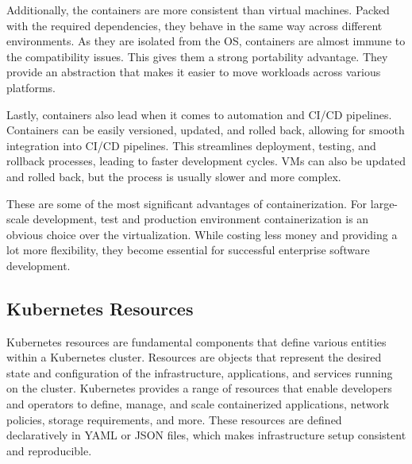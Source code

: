 Additionally, the containers are more consistent than virtual machines. Packed with the required dependencies, they behave in the same way across different environments. As they are isolated from the OS, containers are almost immune to the compatibility issues. This gives them a strong portability advantage. They provide an abstraction that makes it easier to move workloads across various platforms.

Lastly, containers also lead when it comes to automation and CI/CD pipelines. Containers can be easily versioned, updated, and rolled back, allowing for smooth integration into CI/CD pipelines. This streamlines deployment, testing, and rollback processes, leading to faster development cycles. VMs can also be updated and rolled back, but the process is usually slower and more complex.

These are some of the most significant advantages of containerization. For large-scale development, test and production environment containerization is an obvious choice over the virtualization. While costing less money and providing a lot more flexibility, they become essential for successful enterprise software development.

\subsection{Kubernetes Resources}

Kubernetes resources are fundamental components that define various entities within a Kubernetes cluster. Resources are objects that represent the desired state and configuration of the infrastructure, applications, and services running on the cluster. Kubernetes provides a range of resources that enable developers and operators to define, manage, and scale containerized applications, network policies, storage requirements, and more. These resources are defined declaratively in YAML or JSON files, which makes infrastructure setup consistent and reproducible.

